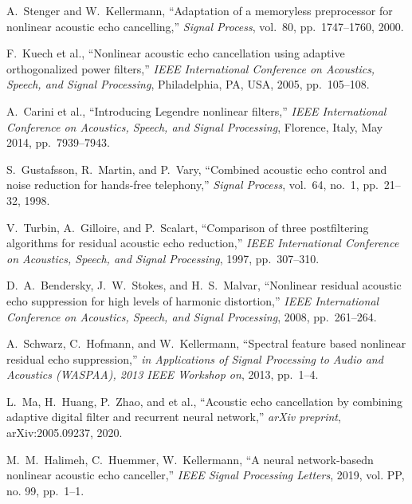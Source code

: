 \documentclass{article}
\begin{document}
\begin{sloppy}
\begin{thebibliography}{9}
   A.\ Stenger and W.\ Kellermann, ``Adaptation of a memoryless preprocessor for nonlinear acoustic echo cancelling,''
   \textit{Signal Process}, vol.~80, pp.~1747--1760, 2000.

   F.\ Kuech et al., ``Nonlinear acoustic echo cancellation using adaptive orthogonalized power filters,''
   \textit{IEEE International Conference on Acoustics, Speech, and Signal Processing}, Philadelphia, PA, USA, 2005, pp.~105--108.

   A.\ Carini et al., ``Introducing Legendre nonlinear filters,''
   \textit{IEEE International Conference on Acoustics, Speech, and Signal Processing}, Florence, Italy, May 2014, pp.~7939--7943.

   S.\ Gustafsson, R.\ Martin, and P.\ Vary, ``Combined acoustic echo control and noise reduction for hands-free telephony,''
   \textit{Signal Process}, vol.~64, no.~1, pp.~21--32, 1998.

   V.\ Turbin, A.\ Gilloire, and P.\ Scalart, ``Comparison of three postfiltering algorithms for residual acoustic echo reduction,''
   \textit{IEEE International Conference on Acoustics, Speech, and Signal Processing}, 1997, pp.~307--310.

   D.\ A.\ Bendersky, J.\ W.\ Stokes, and H.\ S.\ Malvar, ``Nonlinear residual acoustic echo suppression for high levels of harmonic distortion,''
   \textit{IEEE International Conference on Acoustics, Speech, and Signal Processing}, 2008, pp.~261--264.

   A.\ Schwarz, C.\ Hofmann, and W.\ Kellermann, ``Spectral feature based nonlinear residual echo suppression,''
   \textit{in Applications of Signal Processing to Audio and Acoustics (WASPAA), 2013 IEEE Workshop on}, 2013, pp.~1--4.

   L.\ Ma, H.\ Huang, P.\ Zhao, and et al., ``Acoustic echo cancellation by combining adaptive digital filter and recurrent neural network,''
   \textit{arXiv preprint}, arXiv:2005.09237, 2020.


   M.\ M.\ Halimeh, C.\ Huemmer, W.\ Kellermann, ``A neural network-basedn nonlinear acoustic echo canceller,''
   \textit{IEEE Signal Processing Letters}, 2019, vol. PP, no. 99, pp.~1--1.


\end{thebibliography}
\end{sloppy}
\end{document}
